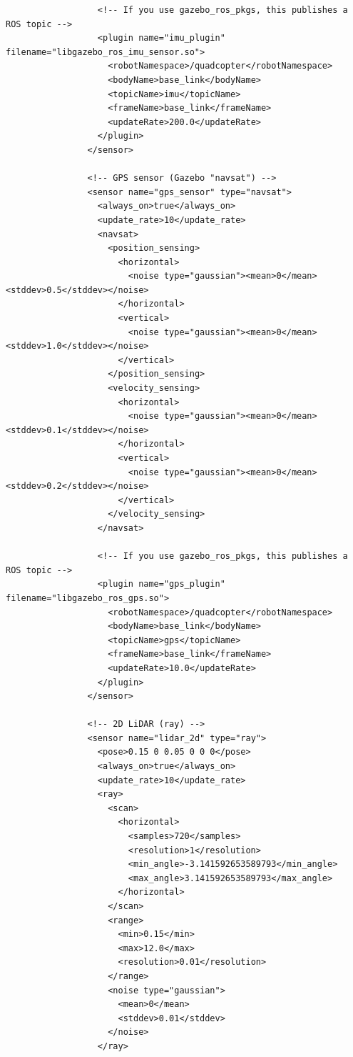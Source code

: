 \documentclass[a4paper]{article}
\begin{document}
\begin{verbatim}
                  <!-- If you use gazebo_ros_pkgs, this publishes a ROS topic -->
                  <plugin name="imu_plugin" filename="libgazebo_ros_imu_sensor.so">
                    <robotNamespace>/quadcopter</robotNamespace>
                    <bodyName>base_link</bodyName>
                    <topicName>imu</topicName>
                    <frameName>base_link</frameName>
                    <updateRate>200.0</updateRate>
                  </plugin>
                </sensor>
        
                <!-- GPS sensor (Gazebo "navsat") -->
                <sensor name="gps_sensor" type="navsat">
                  <always_on>true</always_on>
                  <update_rate>10</update_rate>
                  <navsat>
                    <position_sensing>
                      <horizontal>
                        <noise type="gaussian"><mean>0</mean><stddev>0.5</stddev></noise>
                      </horizontal>
                      <vertical>
                        <noise type="gaussian"><mean>0</mean><stddev>1.0</stddev></noise>
                      </vertical>
                    </position_sensing>
                    <velocity_sensing>
                      <horizontal>
                        <noise type="gaussian"><mean>0</mean><stddev>0.1</stddev></noise>
                      </horizontal>
                      <vertical>
                        <noise type="gaussian"><mean>0</mean><stddev>0.2</stddev></noise>
                      </vertical>
                    </velocity_sensing>
                  </navsat>
        
                  <!-- If you use gazebo_ros_pkgs, this publishes a ROS topic -->
                  <plugin name="gps_plugin" filename="libgazebo_ros_gps.so">
                    <robotNamespace>/quadcopter</robotNamespace>
                    <bodyName>base_link</bodyName>
                    <topicName>gps</topicName>
                    <frameName>base_link</frameName>
                    <updateRate>10.0</updateRate>
                  </plugin>
                </sensor>
        
                <!-- 2D LiDAR (ray) -->
                <sensor name="lidar_2d" type="ray">
                  <pose>0.15 0 0.05 0 0 0</pose>
                  <always_on>true</always_on>
                  <update_rate>10</update_rate>
                  <ray>
                    <scan>
                      <horizontal>
                        <samples>720</samples>
                        <resolution>1</resolution>
                        <min_angle>-3.141592653589793</min_angle>
                        <max_angle>3.141592653589793</max_angle>
                      </horizontal>
                    </scan>
                    <range>
                      <min>0.15</min>
                      <max>12.0</max>
                      <resolution>0.01</resolution>
                    </range>
                    <noise type="gaussian">
                      <mean>0</mean>
                      <stddev>0.01</stddev>
                    </noise>
                  </ray>
        

\end{verbatim}
\end{document}
